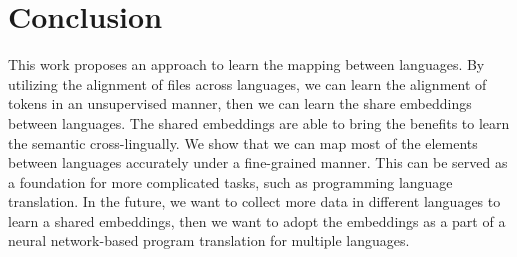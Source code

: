 \section{Conclusion}
This work proposes an approach to learn the mapping between languages. By utilizing the alignment of files across languages, we can learn the alignment of tokens in an unsupervised manner, then we can learn the share embeddings between languages. The shared embeddings are able to bring the benefits to learn the semantic cross-lingually. We show that we can map most of the elements between languages accurately under a fine-grained manner. This can be served as a foundation for more complicated tasks, such as programming language translation. In the future, we want to collect more data in different languages to learn a shared embeddings, then we want to adopt the embeddings as a part of a neural network-based program translation for multiple languages. 



\begin{acks}
	
\end{acks}
